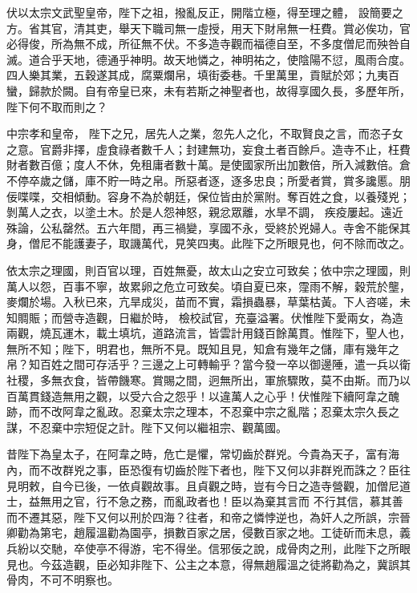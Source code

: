 \begin{pinyinscope}
 伏以太宗文武聖皇帝，陛下之祖，撥亂反正，開階立極，得至理之體，
 設簡要之方。省其官，清其吏，舉天下職司無一虛授，用天下財帛無一枉費。賞必俟功，官必得俊，所為無不成，所征無不伏。不多造寺觀而福德自至，不多度僧尼而殃咎自滅。道合乎天地，德通乎神明。故天地憐之，神明祐之，使陰陽不愆，風雨合度。四人樂其業，五穀遂其成，腐粟爛帛，填街委巷。千里萬里，貢賦於郊；九夷百蠻，歸款於闕。自有帝皇已來，未有若斯之神聖者也，故得享國久長，多歷年所，陛下何不取而則之？



 中宗孝和皇帝，
 陛下之兄，居先人之業，忽先人之化，不取賢良之言，而恣子女之意。官爵非擇，虛食祿者數千人；封建無功，妄食土者百餘戶。造寺不止，枉費財者數百億；度人不休，免租庸者數十萬。是使國家所出加數倍，所入減數倍。倉不停卒歲之儲，庫不貯一時之帛。所惡者逐，逐多忠良；所愛者賞，賞多讒慝。朋佞喋喋，交相傾動。容身不為於朝廷，保位皆由於黨附。奪百姓之食，以養殘兇；剝萬人之衣，以塗土木。於是人怨神怒，親忿眾離，水旱不調，
 疾疫屢起。遠近殊論，公私罄然。五六年間，再三禍變，享國不永，受終於兇婦人。寺舍不能保其身，僧尼不能護妻子，取譏萬代，見笑四夷。此陛下之所眼見也，何不除而改之。



 依太宗之理國，則百官以理，百姓無憂，故太山之安立可致矣；依中宗之理國，則萬人以怨，百事不寧，故累卵之危立可致矣。頃自夏已來，霪雨不解，穀荒於壟，麥爛於場。入秋已來，亢旱成災，苗而不實，霜損蟲暴，草葉枯黃。下人咨嗟，未知賙賑；而營寺造觀，日繼於時，
 檢校試官，充臺溢署。伏惟陛下愛兩女，為造兩觀，燒瓦運木，載土填坑，道路流言，皆雲計用錢百餘萬貫。惟陛下，聖人也，無所不知；陛下，明君也，無所不見。既知且見，知倉有幾年之儲，庫有幾年之帛？知百姓之間可存活乎？三邊之上可轉輸乎？當今發一卒以御邊陲，遣一兵以衛社稷，多無衣食，皆帶饑寒。賞賜之間，迥無所出，軍旅驟敗，莫不由斯。而乃以百萬貫錢造無用之觀，以受六合之怨乎！以違萬人之心乎！伏惟陛下續阿韋之醜
 跡，而不改阿韋之亂政。忍棄太宗之理本，不忍棄中宗之亂階；忍棄太宗久長之謀，不忍棄中宗短促之計。陛下又何以繼祖宗、觀萬國。



 昔陛下為皇太子，在阿韋之時，危亡是懼，常切齒於群兇。今貴為天子，富有海內，而不改群兇之事，臣恐復有切齒於陛下者也，陛下又何以非群兇而誅之？臣往見明敕，自今已後，一依貞觀故事。且貞觀之時，豈有今日之造寺營觀，加僧尼道士，益無用之官，行不急之務，而亂政者也！臣以為棄其言而
 不行其信，慕其善而不遷其惡，陛下又何以刑於四海？往者，和帝之憐悖逆也，為奸人之所誤，宗晉卿勸為第宅，趙履溫勸為園亭，損數百家之居，侵數百家之地。工徒斫而未息，義兵紛以交馳，卒使亭不得游，宅不得坐。信邪佞之說，成骨肉之刑，此陛下之所眼見也。今茲造觀，臣必知非陛下、公主之本意，得無趙履溫之徒將勸為之，冀誤其骨肉，不可不明察也。




\end{pinyinscope}
